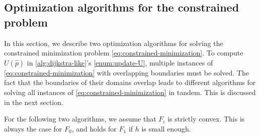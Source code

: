 \documentclass[eikonal.tex]{subfiles}
\begin{document}
\subsection[Optimization algorithms]{Optimization algorithms for the
  constrained problem}

In this section, we describe two optimization algorithms for solving
the constrained minimization problem
\cref{eq:constrained-minimization}. To compute $U(\hat{p})$ in
\cref{alg:dijkstra-like}'s \cref{enum:update-U}, multiple instances of
\cref{eq:constrained-minimization} with overlapping boundaries must be
solved. The fact that the boundaries of their domains overlap leads to
different algorithms for solving all instances of
\cref{eq:constrained-minimization} in tandem. This is discussed in the
next section.

For the following two algorithms, we assume that $F_i$ is strictly
convex. This is always the case for $F_0$, and holds for $F_1$ if $h$
is small enough.
\end{document}

